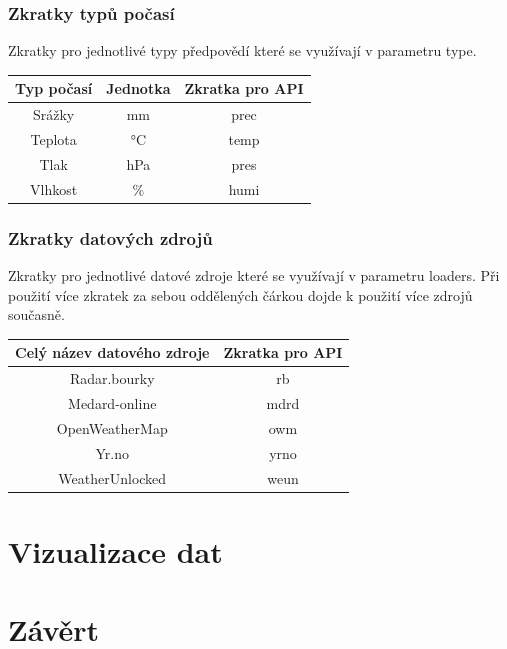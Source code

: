 \documentclass[czech,bachelor,dept460,male,csharp,cpdeclaration]{diploma}
\begin{document}
	\subsubsection{Zkratky typů počasí}
	
	Zkratky pro jednotlivé typy předpovědí které se využívají v parametru type.
	
	\begin{center}
		\begin{tabular}{c c c}
			Typ počasí & Jednotka & Zkratka pro API\\
			\midrule
			Srážky & mm & prec \\
			Teplota & °C & temp \\
			Tlak & hPa & pres \\
			Vlhkost & \% & humi \\
		\end{tabular}
	\end{center}
	
	\subsubsection{Zkratky datových zdrojů}
	
	Zkratky pro jednotlivé datové zdroje které se využívají v parametru loaders. Při použití více zkratek za sebou oddělených čárkou dojde k použití více zdrojů současně.
	
	\begin{center}
		\begin{tabular}{c c}
			Celý název datového zdroje & Zkratka pro API\\
			\midrule
			Radar.bourky & rb \\
			Medard-online & mdrd \\
			OpenWeatherMap & owm \\
			Yr.no & yrno \\
			WeatherUnlocked & weun \\
		\end{tabular}
	\end{center}
	
	\section{Vizualizace dat}
	
	\section{Závěrt}
	
	\printbibliography[title={Literatura}, heading=bibintoc]

	
\end{document}
